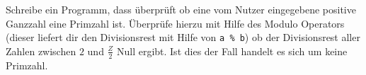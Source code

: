 
Schreibe ein Programm, dass überprüft ob eine vom Nutzer eingegebene positive
Ganzzahl eine Primzahl ist. Überprüfe hierzu mit Hilfe des Modulo Operators
(dieser liefert dir den Divisionsrest mit Hilfe von \texttt{a \% b}) ob
der Divisionsrest aller Zahlen zwischen $2$ und $\frac{Z}{2}$ Null ergibt.
Ist dies der Fall handelt es sich um keine Primzahl.

